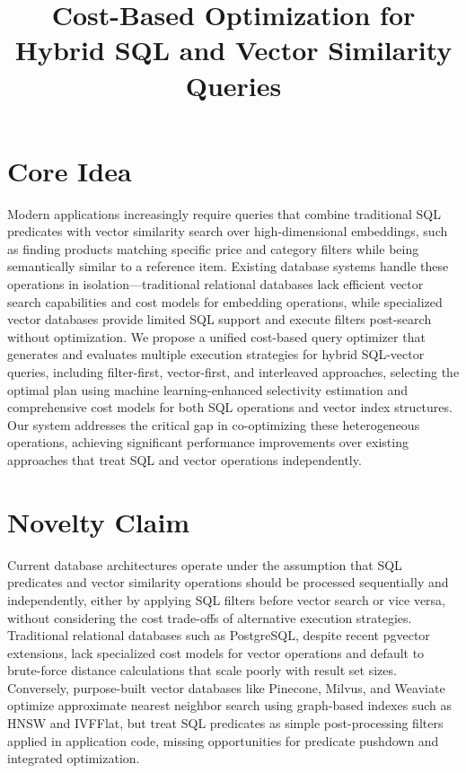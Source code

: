 \documentclass[conference]{IEEEtran}
\begin{document}
\title{Cost-Based Optimization for Hybrid SQL and Vector Similarity Queries}

\author{
}

\maketitle

\section{Core Idea}

Modern applications increasingly require queries that combine traditional SQL predicates with vector similarity search over high-dimensional embeddings, such as finding products matching specific price and category filters while being semantically similar to a reference item. Existing database systems handle these operations in isolation—traditional relational databases lack efficient vector search capabilities and cost models for embedding operations, while specialized vector databases provide limited SQL support and execute filters post-search without optimization. We propose a unified cost-based query optimizer that generates and evaluates multiple execution strategies for hybrid SQL-vector queries, including filter-first, vector-first, and interleaved approaches, selecting the optimal plan using machine learning-enhanced selectivity estimation and comprehensive cost models for both SQL operations and vector index structures. Our system addresses the critical gap in co-optimizing these heterogeneous operations, achieving significant performance improvements over existing approaches that treat SQL and vector operations independently.

\section{Novelty Claim}

Current database architectures operate under the assumption that SQL predicates and vector similarity operations should be processed sequentially and independently, either by applying SQL filters before vector search or vice versa, without considering the cost trade-offs of alternative execution strategies. Traditional relational databases such as PostgreSQL, despite recent pgvector extensions, lack specialized cost models for vector operations and default to brute-force distance calculations that scale poorly with result set sizes. Conversely, purpose-built vector databases like Pinecone, Milvus, and Weaviate optimize approximate nearest neighbor search using graph-based indexes such as HNSW and IVFFlat, but treat SQL predicates as simple post-processing filters applied in application code, missing opportunities for predicate pushdown and integrated optimization.
\end{document}
